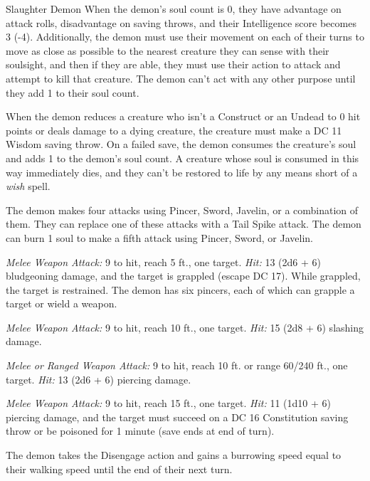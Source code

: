 \documentclass[10pt,a4paper,twoside,bg=print,twocolumn,openany,nodeprecatedcode]{dndbook}
\begin{document}
\begin{DndMonster}[float=t]{Slaughter Demon}
\DndMonsterBasics[
armor-class = {15 (natural armor)},
hit-points = {\DndDice{12d12 + 60}},
speed = {40 ft.}
]
\DndMonsterAbilityScores[
 str = 22,
 dex = 10,
 con = 20,
 int = 8,
 wis = 12,
 cha = 10
]
\DndMonsterDetails[
saving-throws = {Str +9, Dex +3, Con +8},
skills = {Athletics +9, Perception +7},
damage-resistances = {fire},
condition-immunities = {flanked},
senses = {darkvision 60 ft., soulsight 30 ft., passive perception 17},
languages = {Abyssal, Goblin, Infernal},
challenge = 8,
]
When the demon's soul count is 0, they have advantage on attack rolls, disadvantage on saving throws, and their Intelligence score becomes 3 (-4). Additionally, the demon must use their movement on each of their turns to move as close as possible to the nearest creature they can sense with their soulsight, and then if they are able, they must use their action to attack and attempt to kill that creature. The demon can't act with any other purpose until they add 1 to their soul count.

When the demon reduces a creature who isn't a Construct or an Undead to 0 hit points or deals damage to a dying creature, the creature must make a DC 11 Wisdom saving throw. On a failed save, the demon consumes the creature's soul and adds 1 to the demon's soul count. A creature whose soul is consumed in this way immediately dies, and they can't be restored to life by any means short of a \textit{wish} spell.

The demon makes four attacks using Pincer, Sword, Javelin, or a combination of them. They can replace one of these attacks with a Tail Spike attack. The demon can burn 1 soul to make a fifth attack using Pincer, Sword, or Javelin.

\textsl{Melee Weapon Attack:} 9 to hit, reach 5 ft., one target. \textsl{Hit:} 13 (2d6 + 6) bludgeoning damage, and the target is grappled (escape DC 17). While grappled, the target is restrained. The demon has six pincers, each of which can grapple a target or wield a weapon.

\textsl{Melee Weapon Attack:} 9 to hit, reach 10 ft., one target. \textsl{Hit:} 15 (2d8 + 6) slashing damage.

\textsl{Melee or Ranged Weapon Attack:} 9 to hit, reach 10 ft. or range 60/240 ft., one target. \textsl{Hit:} 13 (2d6 + 6) piercing damage.

\textsl{Melee Weapon Attack:} 9 to hit, reach 15 ft., one target. \textsl{Hit:} 11 (1d10 + 6) piercing damage, and the target must succeed on a DC 16 Constitution saving throw or be poisoned for 1 minute (save ends at end of turn).

The demon takes the Disengage action and gains a burrowing speed equal to their walking speed until the end of their next turn.

\end{DndMonster}
\end{document}
